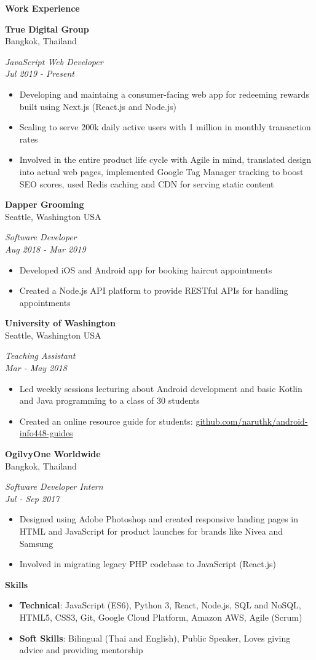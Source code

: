 \documentclass[10pt,a4paper]{article}
\newcommand{\sectionheading}[1]{
  \vspace{14pt}
  \textbf{\Large #1}
  \vspace{6pt}
}
\newcommand{\subheadinginfo}[4]{
  \vspace{6pt}
  \noindent
  \begin{minipage}[t]{.5\textwidth}
    \textbf{#1} \\
    #2
  \end{minipage}%
  \begin{minipage}[t]{.5\textwidth}
    \raggedleft
    \textit{#3} \\
    \textit{#4}
  \end{minipage}
  \vspace{-4pt}
}
\newcommand{\listitem}[1]{
  \item #1 \vspace{-5pt}
}
\begin{document}
\begin{minipage}[t]{0.55\textwidth} 
  \raggedright

  \sectionheading{Work Experience}

  \subheadinginfo
  {True Digital Group}
  {Bangkok, Thailand}
  {JavaScript Web Developer}
  {Jul 2019 - Present}

  \begin{itemize}
    \listitem{Developing and maintaing a consumer-facing web app for redeeming 
    rewards built using Next.js (React.js and Node.js)}
    \listitem{Scaling to serve 200k daily active users with 1 million 
    in monthly transaction rates}
    \listitem{Involved in the entire product life cycle with Agile in mind, 
    translated design into actual web pages, implemented Google Tag Manager 
    tracking to boost SEO scores, used Redis caching and CDN for serving static content}
  \end{itemize}

  \subheadinginfo
  {Dapper Grooming}
  {Seattle, Washington USA}
  {Software Developer}
  {Aug 2018 - Mar 2019}

  \begin{itemize}
    \listitem{Developed iOS and Android app for booking haircut appointments}
    \listitem{Created a Node.js API platform to provide RESTful APIs for handling appointments}
  \end{itemize}

  \subheadinginfo
  {University of Washington}
  {Seattle, Washington USA}
  {Teaching Assistant}
  {Mar - May 2018}

  \begin{itemize}
    \listitem{Led weekly sessions lecturing about Android development and basic
    Kotlin and Java programming to a class of 30 students}
    \listitem{Created an online resource guide for students: \href{https://github.com/naruthk/android-info448-guides}{github.com/naruthk/android-info448-guides}}
  \end{itemize}

  \subheadinginfo
  {OgilvyOne Worldwide}
  {Bangkok, Thailand}
  {Software Developer Intern}
  {Jul - Sep 2017}

  \begin{itemize}
    \listitem{Designed using Adobe Photoshop and created responsive landing pages
    in HTML and JavaScript for product launches for brands like Nivea and Samsung}
    \listitem{Involved in migrating legacy PHP codebase to JavaScript (React.js)}
  \end{itemize}

  \sectionheading{Skills}

  \begin{itemize}
    \listitem{\textbf{Technical}: JavaScript (ES6), Python 3, React, Node.js, SQL and NoSQL,
    HTML5, CSS3, Git, Google Cloud Platform, Amazon AWS, Agile (Scrum)}
    \listitem{\textbf{Soft Skills}: Bilingual (Thai and English), Public Speaker, Loves giving advice and
    providing mentorship}
  \end{itemize}

\end{minipage}%
\end{document}
